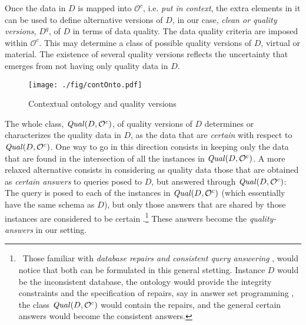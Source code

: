 \documentclass[format=acmsmall, review=false, screen=true]{acmart}
\newcommand{\mc}[1]{\mathcal{ #1}}
\newcommand{\nit}[1]{{\it #1}}
\newcommand{\red}[1]{{#1}}
\begin{document}
 Once the data in $D$ is mapped into $\mc{O}^c$, i.e. {\em put in context}, the extra elements in it can be used to define alternative versions of $D$, in our case, {\em clean or quality versions}, $D^q$, of $D$ in terms of
 data quality. The data quality criteria are imposed within $\mc{O}^c$.  This may determine a class of possible quality versions of $D$, virtual or material. The existence of several quality versions reflects the uncertainty that emerges \red{from not having only quality data in $D$}.

\begin{figure}[h]
\begin{center}
\texttt{[image: ./fig/contOnto.pdf]}\vspace{-3mm}
\caption{Contextual ontology and quality versions}\label{fig:contOnto}
\vspace{-3mm}
\end{center}
\end{figure}





The whole class, $\nit{Qual}(D,\mc{O}^c)$, of quality versions of $D$ determines or characterizes the quality data in $D$, as the data that are {\em certain} with respect to $\nit{Qual}(D,\mc{O}^c)$. One way to go in this direction consists  in keeping only the data that are found in the intersection of all the instances in $\nit{Qual}(D,\mc{O}^c)$. A more relaxed alternative consists in  considering as quality data those that are obtained as {\em certain answers} to queries posed to $D$, but answered through $\nit{Qual}(D,\mc{O}^c)$: The query is posed to each of the instances in $\nit{Qual}(D,\mc{O}^c)$ (which essentially  have the same schema as $D$), but only those answers that are shared by those instances are considered to be certain \cite{imielinski}.\footnote{\ \label{ft:cqa}Those familiar with {\em database repairs and consistent query answering} \cite{bertossi11,bertossi06}, would notice that both can be formulated in this general stetting. Instance $D$ would be the inconsistent database, the ontology would provide the integrity constraints and the specification of repairs, say in answer set programming \cite{monica}, the class $\nit{Qual}(D,\mc{O}^c)$ would contain the repairs, and the general certain answers would become the consistent answers.} These answers become the {\em quality-answers} in our setting.
\end{document}
